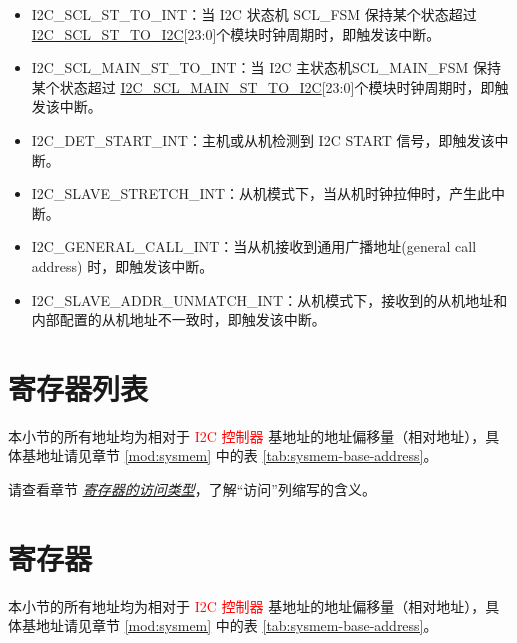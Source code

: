\documentclass[main\_\_CN.tex]{subfiles}
\begin{document}
\begin{itemize}
    \item \label{int:i2c-scl-fsm}I2C\_SCL\_ST\_TO\_INT：当 I2C 状态机 SCL\_FSM 保持某个状态超过 \hyperref[fielddesc:I2CSCLSTTOI2C]{I2C\_SCL\_ST\_TO\_I2C}[23:0]个模块时钟周期时，即触发该中断。
    \item \label{int:i2c-scl-main-fsm}I2C\_SCL\_MAIN\_ST\_TO\_INT：当 I2C 主状态机SCL\_MAIN\_FSM 保持某个状态超过 \hyperref[fielddesc:I2CSCLMAINSTTOI2C]{I2C\_SCL\_MAIN\_ST\_TO\_I2C}[23:0]个模块时钟周期时，即触发该中断。
    \item \label{int:i2c-start}I2C\_DET\_START\_INT：主机或从机检测到 I2C START 信号，即触发该中断。
    \item \label{int:i2c-slave-stretch}I2C\_SLAVE\_STRETCH\_INT：从机模式下，当从机时钟拉伸时，产生此中断。
    \item \label{int:i2c-general-call}I2C\_GENERAL\_CALL\_INT：当从机接收到通用广播地址(general call address) 时，即触发该中断。
    \item \label{int:i2c-slave-addr-unmatch}I2C\_SLAVE\_ADDR\_UNMATCH\_INT：从机模式下，接收到的从机地址和内部配置的从机地址不一致时，即触发该中断。
\end{itemize}




\clearpage
\section{寄存器列表}


\label{sec:i2c-reg-summ}
\hypertarget{i2c-reg-summ}{}

本小节的所有地址均为相对于 \textcolor{red}{I2C 控制器} 基地址的地址偏移量（相对地址），具体基地址请见章节 \ref{mod:sysmem} \textit{} 中的表 \ref{tab:sysmem-base-address}。

请查看章节 \hyperref[glossary-access-types]{\textit{寄存器的访问类型}}，了解“访问”列缩写的含义。




\clearpage
\section{寄存器}

本小节的所有地址均为相对于 \textcolor{red}{I2C 控制器} 基地址的地址偏移量（相对地址），具体基地址请见章节 \ref{mod:sysmem} \textit{} 中的表 \ref{tab:sysmem-base-address}。


\end{document}
